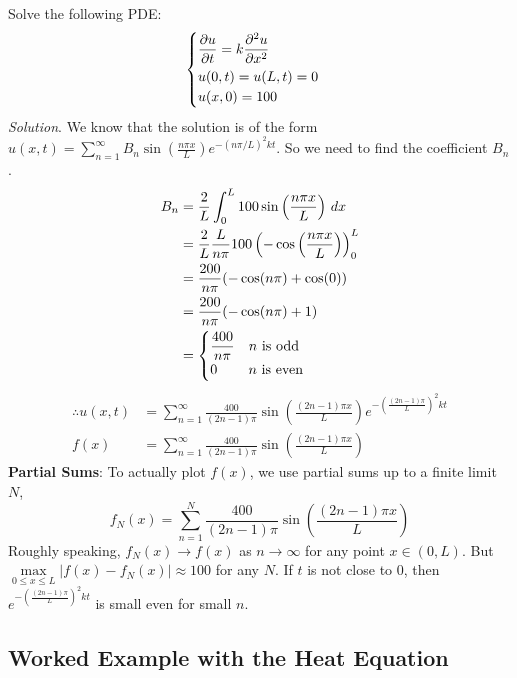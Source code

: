 \documentclass{article}
\begin{document}
	\begin{eg}
		Solve the following PDE:
		\[
			\begin{cases}
				\dfrac{\partial u}{\partial t} = k\dfrac{\partial^2 u}{\partial x^2} \vspace{1mm} \\
				u(0,t) = u(L,t) = 0 \\
				u(x,0) = 100
			\end{cases}
		\]
		\textit{Solution}. We know that the solution is of the form $ u(x,t) = \sum\limits_{n=1}^{\infty} B_n \sin\left( \frac{n\pi x}{L} \right) e^{-(n\pi / L)^2 kt} $. So we need to find the coefficient $ B_n $. 
		\begin{align*}
			B_n &= \frac{2}{L} \int_0^L 100 \sin\left( \frac{n\pi x}{L} \right) \, dx \\
			&= \frac{2}{L} \frac{L}{n\pi} 100 \left(-\cos\left( \frac{n\pi x}{L} \right) \right)_{0}^{L} \\
			&= \frac{200}{n\pi} (-\cos(n\pi) + \cos(0)) \\
			&= \frac{200}{n\pi} (-\cos(n\pi) + 1) \\
			&= \begin{cases}
			       \dfrac{400}{n\pi} \quad n \text{ is odd} \\
			       0 \hspace{7.8mm} n \text{ is even}	
			   \end{cases}
		\end{align*}
		\begin{align*}
			\therefore u(x,t) &= \sum\limits_{n=1}^{\infty} \frac{400}{(2n-1)\pi} \sin\left( \frac{(2n-1)\pi x}{L} \right) e^{-\left(\frac{(2n-1)\pi}{L}\right)^2 kt} \\
			f(x) &= \sum\limits_{n=1}^{\infty} \frac{400}{(2n-1)\pi} \sin\left( \frac{(2n-1)\pi x}{L} \right)
		\end{align*}
		\textbf{Partial Sums}: To actually plot $ f(x) $, we use partial sums up to a finite limit $ N $,
		\[
			f_N(x) = \sum\limits_{n=1}^{N} \frac{400}{(2n-1)\pi} \sin\left( \frac{(2n-1)\pi x}{L} \right)
		\]
		Roughly speaking, $ f_N(x) \to f(x) $ as $ n \to \infty $ for any point $ x \in (0,L) $. But $ \max\limits_{0 \leq x \leq L} |f(x) - f_N(x)| \approx 100 $ for any $ N $. If $ t $ is not close to 0, then $ e^{-\left(\frac{(2n-1)\pi}{L}\right)^2 kt} $ is small even for small $ n $.
	\end{eg}
	
	\subsection{Worked Example with the Heat Equation}
	
\end{document}
